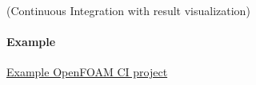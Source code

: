 \documentclass[
	aspectratio=169,%
	color={accentcolor=2d},
	logo=true,%
	colorframetitle=true,%
	]{tudabeamer}
\begin{document}
\begin{frame}{(Continuous Integration with result visualization)} 
    \framesubtitle{Example}

    \vfill
    \begin{center}
        \href{https://gitlab.com/tmaric/fvc-reconstruct/-/pipelines/279564790}{Example OpenFOAM CI project} 
    \end{center}

\end{frame}



	

\end{document}
